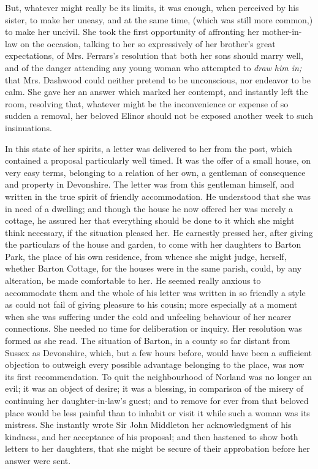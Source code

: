 But, whatever might really be its limits, it was enough, when perceived by his sister, to make her uneasy, and at the same time, (which was still more common,) to make her uncivil. She took the first opportunity of affronting her mother-in-law on the occasion, talking to her so expressively of her brother's great expectations, of Mrs. Ferrars's resolution that both her sons should marry well, and of the danger attending any young woman who attempted to {\em draw him in;} that Mrs. Dashwood could neither pretend to be unconscious, nor endeavor to be calm. She gave her an answer which marked her contempt, and instantly left the room, resolving that, whatever might be the inconvenience or expense of so sudden a removal, her beloved Elinor should not be exposed another week to such insinuations.

In this state of her spirits, a letter was delivered to her from the post, which contained a proposal particularly well timed. It was the offer of a small house, on very easy terms, belonging to a relation of her own, a gentleman of consequence and property in Devonshire. The letter was from this gentleman himself, and written in the true spirit of friendly accommodation. He understood that she was in need of a dwelling; and though the house he now offered her was merely a cottage, he assured her that everything should be done to it which she might think necessary, if the situation pleased her. He earnestly pressed her, after giving the particulars of the house and garden, to come with her daughters to Barton Park, the place of his own residence, from whence she might judge, herself, whether Barton Cottage, for the houses were in the same parish, could, by any alteration, be made comfortable to her. He seemed really anxious to accommodate them and the whole of his letter was written in so friendly a style as could not fail of giving pleasure to his cousin; more especially at a moment when she was suffering under the cold and unfeeling behaviour of her nearer connections. She needed no time for deliberation or inquiry. Her resolution was formed as she read. The situation of Barton, in a county so far distant from Sussex as Devonshire, which, but a few hours before, would have been a sufficient objection to outweigh every possible advantage belonging to the place, was now its first recommendation. To quit the neighbourhood of Norland was no longer an evil; it was an object of desire; it was a blessing, in comparison of the misery of continuing her daughter-in-law's guest; and to remove for ever from that beloved place would be less painful than to inhabit or visit it while such a woman was its mistress. She instantly wrote Sir John Middleton her acknowledgment of his kindness, and her acceptance of his proposal; and then hastened to show both letters to her daughters, that she might be secure of their approbation before her answer were sent.

